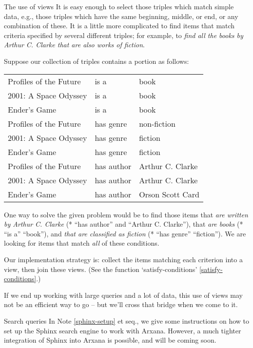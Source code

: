 \begin{notate}{The use of views} \label{use-of-views}
It is easy enough to select those triples which match
simple data, e.g., those triples which have the same
beginning, middle, or end, or any combination of these.
It is a little more complicated to find items that match
criteria specified by several different triples; for
example, to \emph{find all the books by Arthur C. Clarke
  that are also works of fiction}.

Suppose our collection of triples contains a portion as
follows:
\begin{center}
\begin{tabular}{lll}
Profiles of the Future & is a & book \\ 2001: A Space
Odyssey & is a & book \\ Ender's Game & is a & book
\\ Profiles of the Future & has genre & non-fiction
\\ 2001: A Space Odyssey & has genre & fiction \\ Ender's
Game & has genre & fiction \\ Profiles of the Future & has
author & Arthur C. Clarke \\ 2001: A Space Odyssey & has
author & Arthur C. Clarke \\ Ender's Game & has author &
Orson Scott Card
\end{tabular}
\end{center}

One way to solve the given problem would be to find those
items that \emph{are written by Arthur C. Clarke} (* ``has
author'' and ``Arthur C. Clarke''), that \emph{are books}
(* ``is a'' ``book''), and \emph{that are classified as
  fiction} (* ``has genre'' ``fiction'').  We are looking
for items that match \emph{all} of these conditions.

Our implementation strategy is: collect the items matching
each criterion into a view, then join these views.  (See
the function `satisfy-conditions'
\ref{satisfy-conditions}.)

If we end up working with large queries and a lot of data,
this use of views may not be an efficient way to go -- but
we'll cross that bridge when we come to it.
\end{notate}

\begin{notate}{Search queries}
In Note \ref{sphinx-setup} et seq., we give some
instructions on how to set up the Sphinx search engine to
work with Arxana.  However, a much tighter integration of
Sphinx into Arxana is possible, and will be coming soon.
\end{notate}

